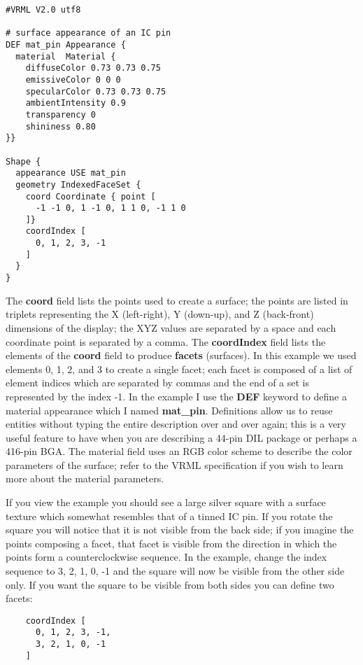 \documentclass[a4paper]{article}
\begin{document}
\begin{verbatim}
#VRML V2.0 utf8

# surface appearance of an IC pin
DEF mat_pin Appearance {
  material  Material {
    diffuseColor 0.73 0.73 0.75
    emissiveColor 0 0 0
    specularColor 0.73 0.73 0.75
    ambientIntensity 0.9
    transparency 0
    shininess 0.80
}}

Shape {
  appearance USE mat_pin
  geometry IndexedFaceSet {
    coord Coordinate { point [
      -1 -1 0, 1 -1 0, 1 1 0, -1 1 0
    ]}
    coordIndex [
      0, 1, 2, 3, -1
    ]
  }
}
\end{verbatim}

The \textbf{coord} field lists the points used to create a surface; the points are listed in triplets representing the X (left-right),
Y (down-up), and Z (back-front) dimensions of the display; the XYZ values are separated by a space and each coordinate point is
separated by a comma. The \textbf{coordIndex} field lists the elements of the \textbf{coord} field to produce \textbf{facets} (surfaces).
In this example we used elements 0, 1, 2, and 3 to create a single facet; each facet is composed of a list of element indices
which are separated by commas and the end of a set is represented by the index -1. In the example I use the \textbf{DEF} keyword
to define a material appearance which I named \textbf{mat\_pin}. Definitions allow us to reuse entities without typing the entire
description over and over again; this is a very useful feature to have when you are describing a 44-pin DIL package or perhaps a
416-pin BGA.  The material field uses an RGB color scheme to describe the color parameters of the surface; refer to the VRML
specification if you wish to learn more about the material parameters.

If you view the example you should see a large silver square with a surface texture which somewhat resembles that of a tinned IC pin.
If you rotate the square you will notice that it is not visible from the back side; if you imagine the points composing a facet, that facet
is visible from the direction in which the points form a counterclockwise sequence. In the example, change the index sequence to 3, 2, 1, 0, -1
and the square will now be visible from the other side only. If you want the square to be visible from both sides you can define two facets:

\begin{verbatim}
    coordIndex [
      0, 1, 2, 3, -1,
      3, 2, 1, 0, -1
    ]
\end{verbatim}
\end{document}
